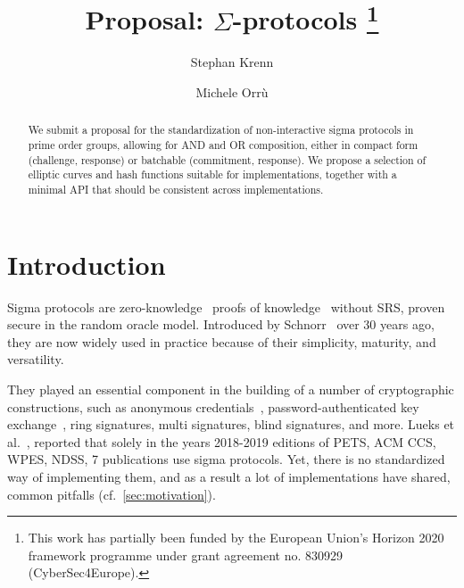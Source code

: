 \documentclass[runningheads]{llncs}
\begin{document}
\title{Proposal: $\Sigma$-protocols%
\thanks{This work has partially been funded by the European Union's Horizon 2020 framework programme under grant agreement no. 830929 (CyberSec4Europe).}}
%

\author{Stephan Krenn \and
        Michele Orr\`u}


%
\maketitle              %
%
\begin{abstract}
  We submit a proposal for the standardization of non-interactive sigma protocols in prime order groups, allowing for AND and OR composition, either in compact form (challenge, response) or batchable (commitment, response). We propose a selection of elliptic curves and hash functions suitable for implementations, together with a minimal API that should be consistent across implementations.

\end{abstract}

\section{Introduction}
Sigma protocols are zero-knowledge~\cite{GolMicRac89} proofs of knowledge~\cite{C:BelGol92} without SRS, proven secure in the random oracle model.
Introduced by Schnorr~\cite{JC:Schnorr91} over 30 years ago, they are now widely used  in practice because of their simplicity, maturity, and versatility.

They played an essential component in the building of a number of cryptographic
constructions,
such as anonymous credentials~\cite{CCS:ChaMeiZav14}, password-authenticated key exchange~\cite{jpake},
ring signatures, multi signatures, blind signatures, and more.
Lueks et al.~\cite{zksk}, reported that solely in the years 2018-2019 editions of PETS, ACM CCS, WPES, NDSS,
7 publications use sigma protocols.
Yet, there is no standardized way of implementing them, and as a result a lot of implementations have shared, common pitfalls (cf.\ \cref{sec:motivation}).
\end{document}
